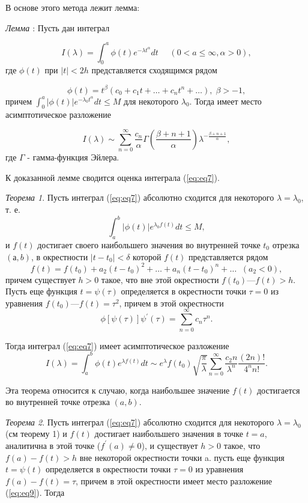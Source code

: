 \documentclass[14pt, a4paper]{article}
\numberwithin{figure}{section}
\numberwithin{equation}{section}
\begin{document}
В основе этого метода лежит лемма:

\textit{Лемма \label{lemma:lemma1}}: Пусть дан интеграл

$$
I(\lambda) = \int_{0}^{a}\phi(t)e^{-\lambda t^\alpha}dt \:\:\:\:\:\: (0 < a \le \infty, \alpha>0),
$$
где $\phi(t)$ при $|t|<2h$ представляется сходящимся рядом

$$
\phi(t)=t^\beta(c_0+c_1 t+\dots+c_n t^n+\dots), \; \beta>-1,
$$
причем $\int_{0}^{a}|\phi(t)| e^{-\lambda_0 t^\alpha}dt\le M$ для некоторого $\lambda_0$. Тогда имеет место асимптотическое разложение

\begin{equation}\label{eq:eq8}
I(\lambda) \sim \sum_{n=0}^{\infty}\frac{c_n}{\alpha} \Gamma\left(\frac{\beta + n + 1}{\alpha}\right)\lambda^{-\frac{\beta + n + 1}{\alpha}},
\end{equation} 
где $\Gamma$ - гамма-функция Эйлера.

К доказанной лемме сводится оценка интеграла (\ref{eq:eq7}).

\textit{Теорема 1\label{th:th1}}. Пусть интеграл (\ref{eq:eq7}) абсолютно сходится для некоторого $\lambda = \lambda_0$, т. е.
$$
\int_{a}^{b} |\phi(t)|e^{\lambda_0 f(t)}dt \le M,
$$
и $f(t)$ достигает своего наибольшего значения во внутренней точке $t_0$ отрезка $(а, b)$, в окрестности $| t - t_0| < \delta$ которой $f(t)$ представляется рядом
$$
f(t)=f(t_0) + a_2(t-t_0)^2+\dots+a_n(t-t_0)^n+\dots \;\; (a_2<0),
$$
причем существует $h > 0$ такое, что вне этой окрестности $f (t_0) — f(t) > h$. Пусть еще функция $t = \psi(\tau)$ определяется в окрестности точки $\tau = 0$ из уравнения $f(t_0) — f(t) = \tau^2$, причем в этой окрестности
\begin{equation}\label{eq:eq9}
\phi[\psi(\tau)]\psi^\prime(\tau) = \sum_{n=0}^{\infty} c_n\tau^n.
\end{equation}

Тогда интеграл (\ref{eq:eq7}) имеет асимптотическое разложение
$$
I(\lambda)=\int_{a}^{b}\phi(t)e^{\lambda f(t)}dt \sim e^\lambda f(t_0) \sqrt{\frac{\pi}{\lambda}} \sum_{n=0}^{\infty}\frac{c_2n}{\lambda^n}\frac{(2n)!}{4^n n!}.
$$

Эта теорема относится к случаю, когда наибольшее значение $f(t)$ достигается во внутренней точке отрезка $(a, b)$. 

\textit{Теорема 2\label{th:th2}}. Пусть интеграл (\ref{eq:eq7}) абсолютно сходится для некоторого $\lambda = \lambda_0$ (см теорему 1) и $f(t)$ достигает наибольшего значения в точке $t=a$, аналитична в этой точке ($f^\prime(a) \neq 0$), и существует $h>0$ такое, что $f(a)-f(t)>h$ вне некоторой окрестности точки a. пусть еще функция $t=\psi(t)$ определяется в окрестности точки $\tau=0$ из уравнения $f(a) - f(t) = \tau$, причем в этой окрестности имеет место разложение (\ref{eq:eq9}). Тогда
\end{document}
